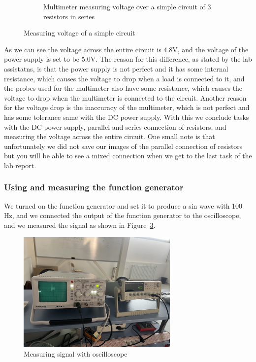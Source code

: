 \documentclass[a4paper, 10pt]{article}
\newcommand{\figref}[1]{Figure~\ref{#1}}
\begin{document}
\begin{figure}[h]
\begin{subfigure}[h]{0.65\textwidth}
								\caption{Multimeter measuring voltage over a simple circuit of 3 resistors in series}
								\label{sub-fig:MeasuringVoltageOfASimpleCircuit}
							\end{subfigure}

							\caption{Measuring voltage of a simple circuit}
							\label{fig:MeasuringVoltageOfACircuit}
					\end{figure}

					As we can see the voltage across the entire circuit is $4.8\text{V}$, and the voltage of the power supply is set to be $5.0\text{V}$. The reason for this difference, as stated by the
					lab assistatns, is that the power supply is not perfect and it has some internal resistance, which causes the voltage to drop when a load is connected to it, and the 
					probes used for the multimeter also have some resistance, which causes the voltage to drop when the multimeter is connected to the circuit. Another reason for the voltage drop is the
					inaccuracy of the multimeter, which is not perfect and has some tolerance same with the DC power supply. With this we conclude tasks with the DC power supply, parallel and series connection
					of resistors, and measuring the voltage across the entire circuit. One small note is that unfortunately we did not save our images of the parallel connection of resistors but you will be
					able to see a mixed connection when we get to the last task of the lab report.
				
				\subsubsection{Using and measuring the function generator}
					We turned on the function generator and set it to produce a sin wave with 100 Hz, and we connected the output of the function generator to the oscilloscope, and we measured the signal as shown in \figref{fig:MeasuringSignalWithOscilloscope}.
					\begin{figure}[h!]
						\centering
						\includegraphics[width=0.7\textwidth]{./images/MeasuringSignalWithOscilloscope.jpeg}
						\caption{Measuring signal with oscilloscope}
						\label{fig:MeasuringSignalWithOscilloscope}
					\end{figure}
\end{document}
